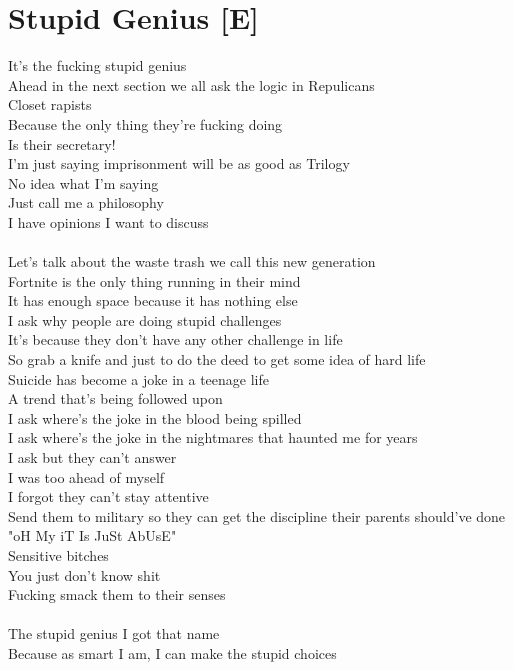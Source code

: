 \documentclass[12pt, b5paper, oneside]{book}
\begin{document}
\section{Stupid Genius [E]}
It's the fucking stupid genius
\\Ahead in the next section we all ask the logic in Repulicans 
\\Closet rapists 
\\Because the only thing they're fucking doing 
\\Is their secretary!
\\I'm just saying imprisonment will be as good as Trilogy
\\No idea what I'm saying
\\Just call me a philosophy
\\I have opinions I want to discuss
%
\\\\Let's talk about the waste trash we call this new generation 
\\Fortnite is the only thing running in their mind 
\\It has enough space because it has nothing else
\\I ask why people are doing stupid challenges 
\\It's because they don't have any other challenge in life 
\\So grab a knife and just to do the deed to get some idea of hard life 
\\Suicide has become a joke in a teenage life 
\\A trend that's being followed upon 
\\I ask where's the joke in the blood being spilled 
\\I ask where's the joke in the nightmares that haunted me for years 
\\I ask but they can't answer 
\\I was too ahead of myself 
\\I forgot they can't stay attentive
\\Send them to military so they can get the discipline their parents should've done 
\\"oH My iT Is JuSt AbUsE"
\\Sensitive bitches
\\You just don't know shit 
\\Fucking smack them to their senses 
%
\\\\The stupid genius I got that name 
\\Because as smart I am, I can make the stupid choices 
\end{document}
